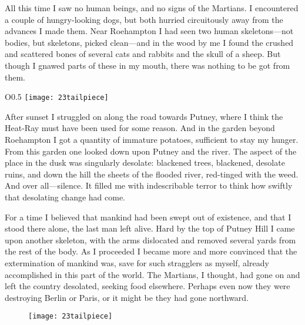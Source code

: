 All this time I saw no human beings, and no signs of the Martians. I encountered a couple of hungry-looking dogs, but both hurried circuitously away from the advances I made them. Near Roehampton I had seen two human skeletons—not bodies, but skeletons, picked clean—and in the wood by me I found the crushed and scattered bones of several cats and rabbits and the skull of a sheep. But though I gnawed parts of these in my mouth, there was nothing to be got from them.


\begin{a4}
	\begin{wrapfigure}{O}{0.5\textwidth}
		\centering
		\texttt{[image: 23tailpiece]}
	\end{wrapfigure}
\end{a4}

After sunset I struggled on along the road towards Putney, where I think the Heat-Ray must have been used for some reason. And in the garden beyond Roehampton I got a quantity of immature potatoes, sufficient to stay my hunger. From this garden one looked down upon Putney and the river. The aspect of the place in the dusk was singularly desolate: blackened trees, blackened, desolate ruins, and down the hill the sheets of the flooded river, red-tinged with the weed. And over all—silence. It filled me with indescribable terror to think how swiftly that desolating change had come.

For a time I believed that mankind had been swept out of existence, and that I stood there alone, the last man left alive. Hard by the top of Putney Hill I came upon another skeleton, with the arms dislocated and removed several yards from the rest of the body. As I proceeded I became more and more convinced that the extermination of mankind was, save for such stragglers as myself, already accomplished in this part of the world. The Martians, I thought, had gone on and left the country desolated, seeking food elsewhere. Perhaps even now they were destroying Berlin or Paris, or it might be they had gone northward.

\begin{letter}
	\begin{figure}[bh!]
		\centering
		\texttt{[image: 23tailpiece]}
	\end{figure}
	\enlargethispage{2\baselineskip}
\end{letter}

